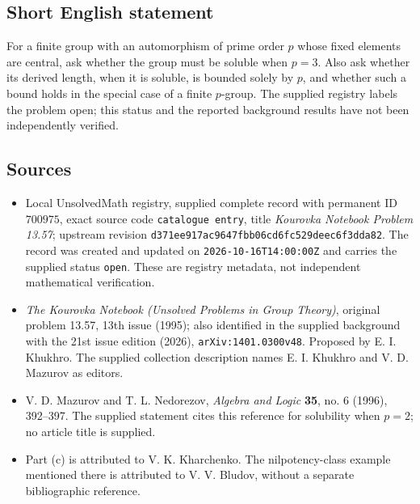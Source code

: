 \documentclass[11pt]{article}
\begin{document}
\subsection{Short English statement}
For a finite group with an automorphism of prime order \(p\) whose fixed elements are central, ask whether the group must be soluble when \(p=3\). Also ask whether its derived length, when it is soluble, is bounded solely by \(p\), and whether such a bound holds in the special case of a finite \(p\)-group. The supplied registry labels the problem open; this status and the reported background results have not been independently verified.
\subsection{Sources}
\begin{itemize}
\item Local UnsolvedMath registry, supplied complete record with permanent ID \(700975\), exact source code \texttt{catalogue entry}, title \emph{Kourovka Notebook Problem 13.57}; upstream revision \texttt{d371ee917ac9647fbb06cd6fc529deec6f3dda82}. The record was created and updated on \texttt{2026-10-16T14:00:00Z} and carries the supplied status \texttt{open}. These are registry metadata, not independent mathematical verification.
\item \emph{The Kourovka Notebook (Unsolved Problems in Group Theory)}, original problem 13.57, 13th issue (1995); also identified in the supplied background with the 21st issue edition (2026), \texttt{arXiv:1401.0300v48}. Proposed by E. I. Khukhro. The supplied collection description names E. I. Khukhro and V. D. Mazurov as editors.
\item V. D. Mazurov and T. L. Nedorezov, \emph{Algebra and Logic} \textbf{35}, no. 6 (1996), 392--397. The supplied statement cites this reference for solubility when \(p=2\); no article title is supplied.
\item Part (c) is attributed to V. K. Kharchenko. The nilpotency-class example mentioned there is attributed to V. V. Bludov, without a separate bibliographic reference.
\end{itemize}
\end{document}
